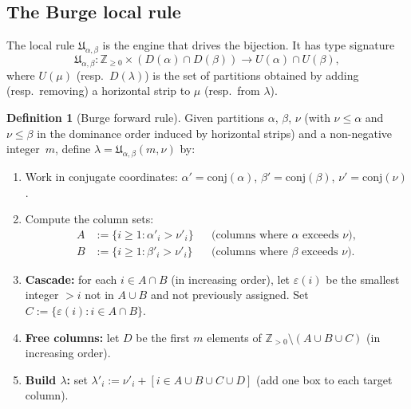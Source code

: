 \documentclass[11pt]{article}
\newcommand{\Z}{\mathbb{Z}}
\theoremstyle{plain}
\theoremstyle{definition}
\newtheorem{definition}[theorem]{Definition}
\begin{document}
\subsection{The Burge local rule}

The local rule $\mathfrak{U}_{\alpha,\beta}$ is the engine that drives
the bijection.  It has type signature
\begin{equation}\label{eq:local-rule-type}
  \mathfrak{U}_{\alpha,\beta}\colon
  \Z_{\geq 0} \times (D(\alpha) \cap D(\beta))
  \to U(\alpha) \cap U(\beta),
\end{equation}
where $U(\mu)$ (resp.\ $D(\lambda)$) is the set of partitions obtained
by adding (resp.\ removing) a horizontal strip to $\mu$
(resp.\ from $\lambda$).

\begin{definition}[Burge forward rule]
\label{def:burge-forward}
Given partitions $\alpha$, $\beta$, $\nu$ (with $\nu \leq \alpha$ and
$\nu \leq \beta$ in the dominance order induced by horizontal strips)
and a non-negative integer~$m$, define $\lambda =
\mathfrak{U}_{\alpha,\beta}(m, \nu)$ by:
\begin{enumerate}
  \item Work in conjugate coordinates: $\alpha' = \mathrm{conj}(\alpha)$,
    $\beta' = \mathrm{conj}(\beta)$, $\nu' = \mathrm{conj}(\nu)$.
  \item Compute the column sets:
    \begin{align*}
      A &:= \{i \geq 1 : \alpha'_i > \nu'_i\}
        && \text{(columns where $\alpha$ exceeds $\nu$)}, \\
      B &:= \{i \geq 1 : \beta'_i > \nu'_i\}
        && \text{(columns where $\beta$ exceeds $\nu$)}.
    \end{align*}
  \item \textbf{Cascade:} for each $i \in A \cap B$ (in increasing
    order), let $\varepsilon(i)$ be the smallest integer $> i$ not
    in $A \cup B$ and not previously assigned.
    Set $C := \{\varepsilon(i) : i \in A \cap B\}$.
  \item \textbf{Free columns:} let $D$ be the first $m$ elements of
    $\Z_{>0} \setminus (A \cup B \cup C)$ (in increasing order).
  \item \textbf{Build $\lambda$:} set $\lambda'_i := \nu'_i + [i \in A \cup B \cup C \cup D]$
    (add one box to each target column).
\end{enumerate}
\end{definition}
\end{document}
